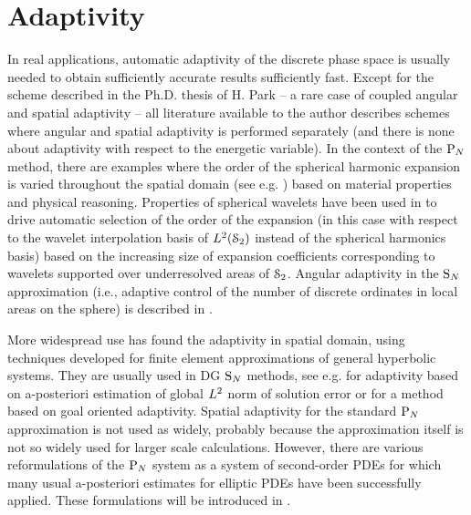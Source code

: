 \section{Adaptivity}
In real applications, automatic adaptivity of the discrete phase space is usually needed to obtain sufficiently accurate
results sufficiently fast. Except for the scheme described in the Ph.D. thesis of H. Park \cite{Park} -- a rare case of coupled angular and spatial adaptivity -- all literature
available to the author describes schemes where angular and spatial adaptivity is performed separately (and there is
none about adaptivity with respect to the energetic variable). In the context of the $\PN$ method, there are examples
where the order of the spherical harmonic expansion is varied throughout the spatial domain (see e.g. \cite{Ackroyd2})
based on material properties and physical reasoning. Properties of spherical wavelets have been used in \cite{Buchan} to
drive automatic selection of the order of the expansion (in this case with respect to the wavelet interpolation basis of
$\Lp[2](\Sphere)$ instead of the spherical harmonics basis) based on the increasing size of expansion coefficients
corresponding to wavelets supported over underresolved areas of $\Sphere$. Angular adaptivity in the $\SN$ approximation
(i.e., adaptive control of the number of discrete ordinates in local areas on the sphere) is described in
\cite{Jarrell}.

More widespread use has found the adaptivity in spatial domain, using techniques developed for finite element
approximations of general hyperbolic systems. They are usually used in DG $\SN$ methods, see e.g.
\cite{Fournier,Duo,ragusa2010two} for adaptivity based on a-posteriori estimation of global $\Lp[2]$ norm of solution
error or \cite{LathouwersGoal, Wang2} for a method based on goal oriented adaptivity. Spatial adaptivity for the
standard $\PN$ approximation is not used as widely, probably because the approximation itself is not so widely used for
larger scale calculations. However, there are various reformulations of the $\PN$ system as a system of second-order
PDEs for which many usual a-posteriori estimates for
elliptic PDEs have been successfully applied. These formulations will be introduced in .

